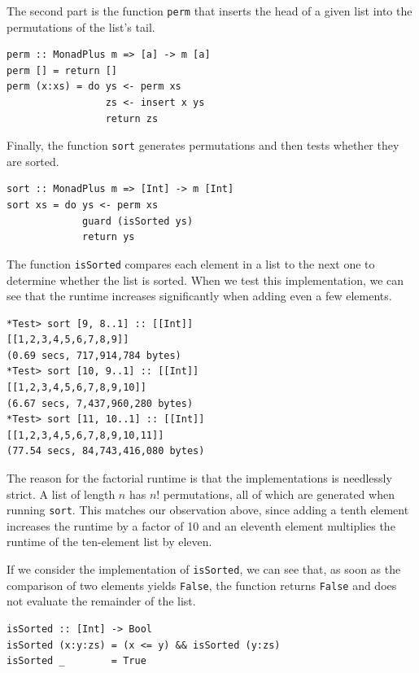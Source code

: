 \documentclass[a4paper, 11pt, fleqn, twoside]{scrreprt}
\begin{document}
The second part is the function \texttt{perm} that inserts the 
head of a given list into the permutations of the list's tail.
\begin{verbatim}
perm :: MonadPlus m => [a] -> m [a]
perm [] = return []
perm (x:xs) = do ys <- perm xs
                 zs <- insert x ys
                 return zs
\end{verbatim}

Finally, the function \texttt{sort} generates permutations and 
then tests whether they are sorted.

\begin{verbatim}
sort :: MonadPlus m => [Int] -> m [Int]
sort xs = do ys <- perm xs
             guard (isSorted ys)
             return ys
\end{verbatim}

The function \texttt{isSorted} compares each element in a list to 
the next one to determine whether the list is sorted. When we test this 
implementation, we can see that the runtime increases significantly when adding 
even a few elements.

\begin{verbatim}
*Test> sort [9, 8..1] :: [[Int]]
[[1,2,3,4,5,6,7,8,9]]
(0.69 secs, 717,914,784 bytes)
*Test> sort [10, 9..1] :: [[Int]]
[[1,2,3,4,5,6,7,8,9,10]]
(6.67 secs, 7,437,960,280 bytes)
*Test> sort [11, 10..1] :: [[Int]]
[[1,2,3,4,5,6,7,8,9,10,11]]
(77.54 secs, 84,743,416,080 bytes)
\end{verbatim}

The reason for the factorial runtime is that the implementations is needlessly 
strict. A list of length $n$  has $n!$ permutations, all of which are generated 
when running \texttt{sort}. This matches our observation above, 
since adding a tenth element increases the runtime by a factor of 10 and an 
eleventh element multiplies the runtime of the ten-element list by eleven. 

If we consider the implementation of \texttt{isSorted}, we can see 
that, as soon as the comparison of two elements yields 
\texttt{False}, the function returns \texttt{False} 
and does not evaluate the remainder of the list.

\begin{verbatim}
isSorted :: [Int] -> Bool
isSorted (x:y:zs) = (x <= y) && isSorted (y:zs)
isSorted _        = True
\end{verbatim}
\end{document}
